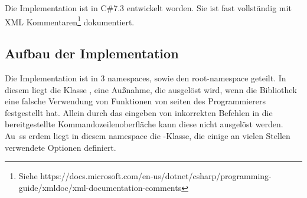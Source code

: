 Die Implementation ist in C\#7.3 entwickelt worden.
Sie ist fast vollständig mit XML Kommentaren\footnote{Siehe https://docs.microsoft.com/en-us/dotnet/csharp/programming-guide/xmldoc/xml-documentation-comments} dokumentiert.
\subsection{Aufbau der Implementation}\label{subsec:Architecture}
Die Implementation ist in 3 namespaces, sowie den root-namespace geteilt.
In diesem liegt die Klasse , eine Au\ss nahme, die ausgelöst wird, wenn die Bibliothek eine falsche Verwendung von Funktionen von seiten des Programmierers festgestellt hat.
Allein durch das eingeben von inkorrekten Befehlen in die bereitgestellte Kommandozeilenoberfläche kann diese nicht ausgelöst werden. Au\
 ss erdem liegt in diesem namespace die -Klasse, die einige an vielen Stellen verwendete Optionen definiert.
